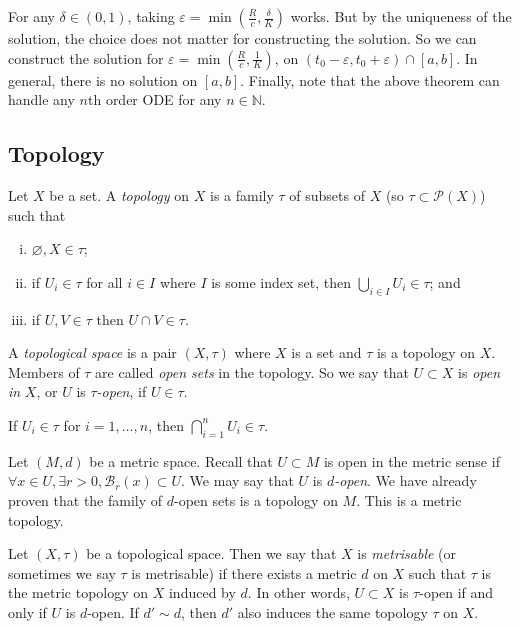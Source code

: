 \begin{remark}
	For any \( \delta \in (0,1) \), taking \( \varepsilon = \min(\frac{R}{c}, \frac{\delta}{K}) \) works.
	But by the uniqueness of the solution, the choice does not matter for constructing the solution.
	So we can construct the solution for \( \varepsilon = \min(\frac{R}{c}, \frac{1}{K}) \), on \( (t_0 - \varepsilon, t_0 + \varepsilon) \cap [a,b] \).
	In general, there is no solution on \( [a,b] \).
	Finally, note that the above theorem can handle any \( n \)th order ODE for any \( n \in \mathbb N \).
\end{remark}

\subsection{Topology}
\begin{definition}
	Let \( X \) be a set.
	A \textit{topology} on \( X \) is a family \( \tau \) of subsets of \( X \) (so \( \tau \subset \mathcal P(X) \)) such that
	\begin{enumerate}[(i)]
		\item \( \varnothing, X \in \tau \);
		\item if \( U_i \in \tau \) for all \( i \in I \) where \( I \) is some index set, then \( \bigcup_{i \in I} U_i \in \tau \); and
		\item if \( U, V \in \tau \) then \( U \cap V \in \tau \).
	\end{enumerate}
	A \textit{topological space} is a pair \( (X, \tau) \) where \( X \) is a set and \( \tau \) is a topology on \( X \).
	Members of \( \tau \) are called \textit{open sets} in the topology.
	So we say that \( U \subset X \) is \textit{open in} \( X \), or \( U \) is \( \tau \)\textit{-open}, if \( U \in \tau \).
\end{definition}
\begin{remark}
	If \( U_i \in \tau \) for \( i = 1, \dots, n \), then \( \bigcap_{i=1}^n U_i \in \tau \).
\end{remark}
\begin{example}
	Let \( (M, d) \) be a metric space.
	Recall that \( U \subset M \) is open in the metric sense if \( \forall x \in U, \exists r > 0, \mathcal B_r(x) \subset U \).
	We may say that \( U \) is \( d \)\textit{-open}.
	We have already proven that the family of \( d \)-open sets is a topology on \( M \).
	This is a metric topology.
\end{example}
\begin{definition}
	Let \( (X, \tau) \) be a topological space.
	Then we say that \( X \) is \textit{metrisable} (or sometimes we say \( \tau \) is metrisable) if there exists a metric \( d \) on \( X \) such that \( \tau \) is the metric topology on \( X \) induced by \( d \).
	In other words, \( U \subset X \) is \( \tau \)-open if and only if \( U \) is \( d \)-open.
	If \( d' \sim d \), then \( d' \) also induces the same topology \( \tau \) on \( X \).
\end{definition}
